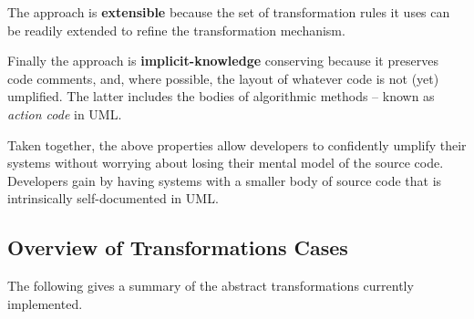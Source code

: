 The approach is \textbf{extensible} because the set of transformation rules it uses can be readily extended to refine the transformation mechanism. 

Finally the approach is \textbf{implicit-knowledge} conserving because it preserves code comments, and, where possible, the layout of whatever code is not (yet) umplified. The latter includes the bodies of algorithmic methods – known as \textit{action code} in UML.

Taken together, the above properties allow developers to confidently umplify their systems without worrying about losing their mental model of the source code. Developers gain by having systems with a smaller body of source code that is intrinsically self-documented in UML. 

\subsection{Overview of Transformations Cases}
\label{subsection:overview}
The following gives a summary of the abstract transformations currently implemented. 
